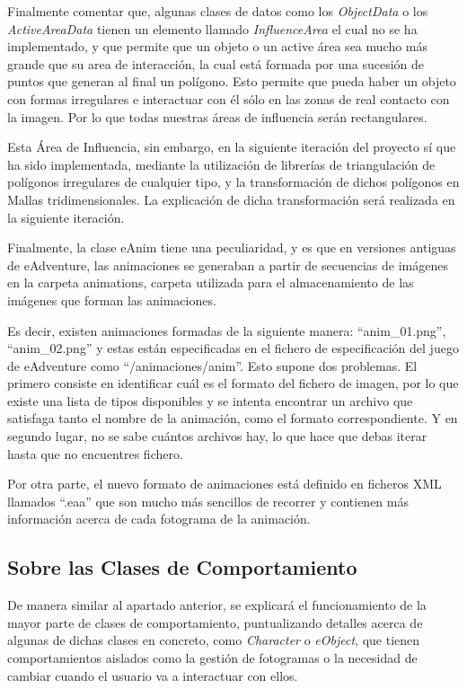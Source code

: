Finalmente comentar que, algunas clases de datos como los \textit{ObjectData} o los \textit{ActiveAreaData} tienen un elemento llamado \textit{InfluenceArea} el cual no se ha implementado, y que permite que un objeto o un active área sea mucho más grande que su area de interacción, la cual está formada por una sucesión de puntos que generan al final un polígono. Esto permite que pueda haber un objeto con formas irregulares e interactuar con él sólo en las zonas de real contacto con la imagen. Por lo que todas nuestras áreas de influencia serán rectangulares.

Esta Área de Influencia, sin embargo, en la siguiente iteración del proyecto sí que ha sido implementada, mediante la utilización de librerías de triangulación de polígonos irregulares de cualquier tipo, y la transformación de dichos polígonos en Mallas tridimensionales. La explicación de dicha transformación será realizada en la siguiente iteración.

Finalmente, la clase eAnim tiene una peculiaridad, y es que en versiones antiguas de eAdventure, las animaciones se generaban a partir de secuencias de imágenes en la carpeta animations, carpeta utilizada para el almacenamiento de las imágenes que forman las animaciones.

Es decir, existen animaciones formadas de la siguiente manera: “anim\_01.png”, “anim\_02.png” y estas están especificadas en el fichero de especificación del juego de eAdventure como “/animaciones/anim”. Esto supone dos problemas. El primero consiste en identificar cuál es el formato del fichero de imagen, por lo que existe una lista de tipos disponibles y se intenta encontrar un archivo que satisfaga tanto el nombre de la animación, como el formato correspondiente. Y en segundo lugar, no se sabe cuántos archivos hay, lo que hace que debas iterar hasta que no encuentres fichero.

Por otra parte, el nuevo formato de animaciones está definido en ficheros XML llamados “.eaa” que son mucho más sencillos de recorrer y contienen más información acerca de cada fotograma de la animación.

\subsection{Sobre las Clases de Comportamiento}
\label{behavioursit1}

De manera similar al apartado anterior, se explicará el funcionamiento de la mayor parte de clases de comportamiento, puntualizando detalles acerca de algunas de dichas clases en concreto, como \textit{Character} o \textit{eObject}, que tienen comportamientos aislados como la gestión de fotogramas o la necesidad de cambiar cuando el usuario va a interactuar con ellos.

